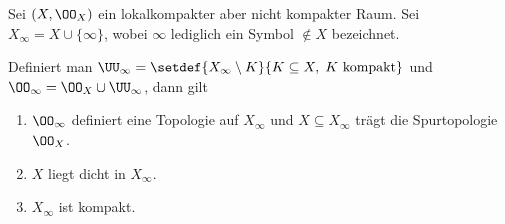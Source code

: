 \begin{prop}
\label{prop:2.3.21}
Sei $(X,\OO_X)$ ein lokalkompakter aber nicht kompakter Raum. Sei $X_\infty =
X\cup\{\infty\}$, wobei $\infty$ lediglich ein Symbol $\notin X$ bezeichnet.

Definiert man $\UU_\infty = \setdef{X_\infty\setminus K}{K\subseteq X,\;K\text{
kompakt}}$ und $\OO_\infty=\OO_X\cup\UU_\infty$, dann gilt
\begin{enumerate}
  \item 
$\OO_\infty$ definiert eine Topologie auf $X_\infty$ und $X\subseteq X_\infty$
trägt die Spurtopologie $\OO_X$.
\item $X$ liegt dicht in $X_\infty$.
\item $X_\infty$ ist kompakt.\fishhere
\end{enumerate}
\end{prop}
